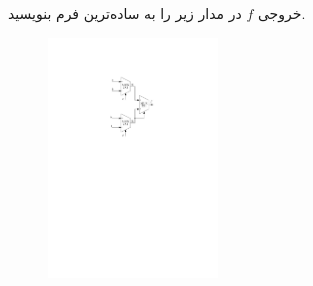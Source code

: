 

خروجی $f$ در مدار زیر را به ساده‌ترین فرم  بنویسید.

\begin{figure}[h]
	\centering
	\includegraphics[width=0.4\textwidth]{fig/Q7.pdf}
	\label{fig:Q7}
\end{figure}